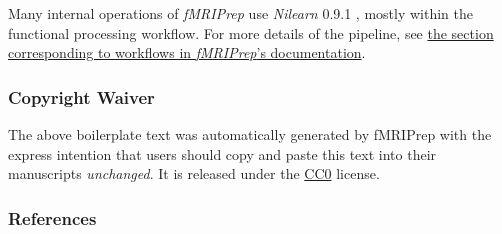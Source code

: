 \documentclass[
]{article}
\begin{document}
Many internal operations of \emph{fMRIPrep} use \emph{Nilearn} 0.9.1
\citep[RRID:SCR\_001362]{nilearn}, mostly within the functional
processing workflow. For more details of the pipeline, see
\href{https://fmriprep.readthedocs.io/en/latest/workflows.html}{the
section corresponding to workflows in \emph{fMRIPrep}'s documentation}.

\hypertarget{copyright-waiver}{%
\subsubsection{Copyright Waiver}\label{copyright-waiver}}

The above boilerplate text was automatically generated by fMRIPrep with
the express intention that users should copy and paste this text into
their manuscripts \emph{unchanged}. It is released under the
\href{https://creativecommons.org/publicdomain/zero/1.0/}{CC0} license.

\hypertarget{references}{%
\subsubsection{References}\label{references}}

  
\end{document}
